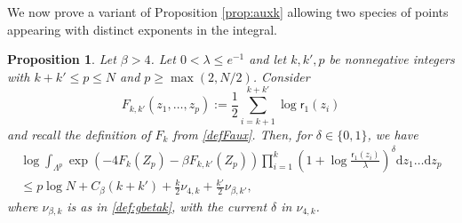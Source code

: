 \documentclass[a4paper,10pt,leqno]{amsart}
\numberwithin{equation}{section}
\newtheorem{prop}{Proposition}[section]
\newcommand{\dd}{\mathrm{d}}
\def\rr{\mathsf{r}}
\begin{document}
We now prove a variant of Proposition \ref{prop:auxk} allowing two species of points appearing with distinct exponents in the integral.

\begin{prop}\label{prop:two species}Let $\beta >4$. Let $0<\lambda\le e^{-1}$ and let $k,k',p$ be nonnegative integers with $k+k'\le p\le N$ and $p\ge\max(2,N/2)$. Consider
  \begin{equation*}
    F_{k,k'}(z_1,\ldots,z_p):=\frac{1}{2}\sum_{i=k+1}^{k+k'} \log \rr_1(z_i)
  \end{equation*}
  and recall the definition of $F_k$ from \eqref{defFaux}. Then, for $\delta\in \{0,1\}$, we have
  \begin{multline}\label{eq:two species}
    \log \int_{\Lambda^p}\exp(-4F_k(Z_p)-\beta F_{k,k'}(Z_p))\prod_{i=1}^k \left(1+\log\frac{\rr_1(z_i)}{\lambda}\right)^\delta \dd z_1\ldots \dd z_p \\ \leq p\log N+C_\beta(k+k')+\frac{k}{2}\nu_{4,k}+\frac{k'}{2}\nu_{\beta,k'},
  \end{multline}
  where $\nu_{\beta,k}$ is as in \eqref{def:gbetak}, with the current $\delta$ in $\nu_{4,k}$.
\end{prop}
\end{document}
